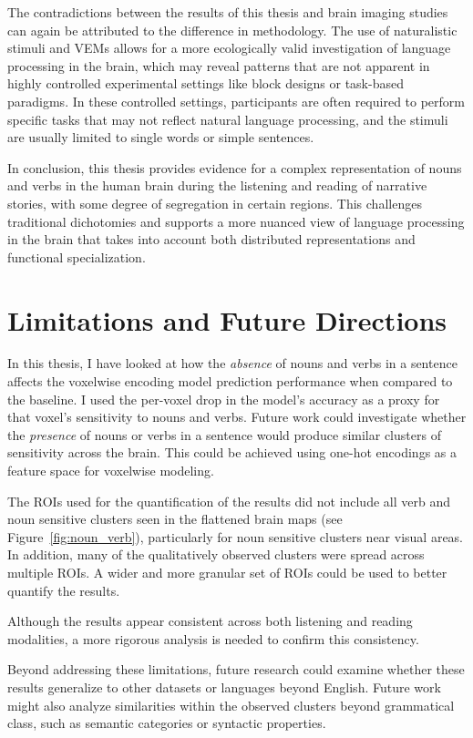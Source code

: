\documentclass[a4paper]{article}
\begin{document}
The contradictions between the results of this thesis and brain imaging studies can again be attributed to the difference in methodology. The use of naturalistic stimuli and VEMs allows for a more ecologically valid investigation of language processing in the brain, which may reveal patterns that are not apparent in highly controlled experimental settings like block designs or task-based paradigms. In these controlled settings, participants are often required to perform specific tasks that may not reflect natural language processing, and the stimuli are usually limited to single words or simple sentences.

In conclusion, this thesis provides evidence for a complex representation of nouns and verbs in the human brain during the listening and reading of narrative stories, with some degree of segregation in certain regions. This challenges traditional dichotomies and supports a more nuanced view of language processing in the brain that takes into account both distributed representations and functional specialization.

\section*{Limitations and Future Directions}
In this thesis, I have looked at how the \textit{absence} of nouns and verbs in a sentence affects the voxelwise encoding model prediction performance when compared to the baseline. I used the per-voxel drop in the model's accuracy as a proxy for that voxel's sensitivity to nouns and verbs. Future work could investigate whether the \textit{presence} of nouns or verbs in a sentence would produce similar clusters of sensitivity across the brain. This could be achieved using one-hot encodings as a feature space for voxelwise modeling.

The ROIs used for the quantification of the results did not include all verb and noun sensitive clusters seen in the flattened brain maps (see Figure~\ref{fig:noun_verb}), particularly for noun sensitive clusters near visual areas. In addition, many of the qualitatively observed clusters were spread across multiple ROIs. A wider and more granular set of ROIs could be used to better quantify the results.

Although the results appear consistent across both listening and reading modalities, a more rigorous analysis is needed to confirm this consistency.

Beyond addressing these limitations, future research could examine whether these results generalize to other datasets or languages beyond English. Future work might also analyze similarities within the observed clusters beyond grammatical class, such as semantic categories or syntactic properties.
\end{document}

